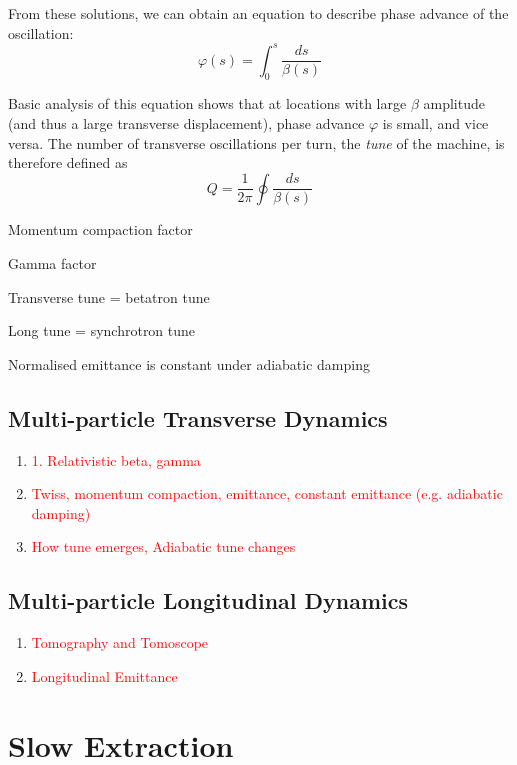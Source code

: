 \documentclass[11pt]{report}
\newcommand\todo[1]{\textcolor{red}{#1}}
\begin{document}
From these solutions, we can obtain an equation to describe phase advance of the oscillation:
\begin{equation}
\varphi(s)=\int^s_0\frac{ds}{\beta(s)}
\end{equation}

Basic analysis of this equation shows that at locations with large $\beta$ amplitude (and thus a large transverse displacement), phase advance $\varphi$ is small, and vice versa. The number of transverse oscillations per turn, the {\it tune} of the machine, is therefore defined as
\begin{equation}
Q=\frac1{2\pi}\oint\frac{ds}{\beta(s)}
\end{equation}

Momentum compaction factor

Gamma factor

Transverse tune = betatron tune

Long tune = synchrotron tune

Normalised emittance is constant under adiabatic damping

\subsection{Multi-particle Transverse Dynamics}\label{sec:theory-transverse}
\begin{enumerate}
    \item \todo{1. Relativistic beta, gamma}
    \item \todo{Twiss, momentum compaction, emittance, constant emittance (e.g. adiabatic damping)}
    \item \todo{How tune emerges, Adiabatic tune changes}
\end{enumerate}

\subsection{Multi-particle Longitudinal Dynamics}
\begin{enumerate}
    \item \todo{Tomography and Tomoscope}
    \item \todo{Longitudinal Emittance}
\end{enumerate}


\section{Slow Extraction}
\end{document}
